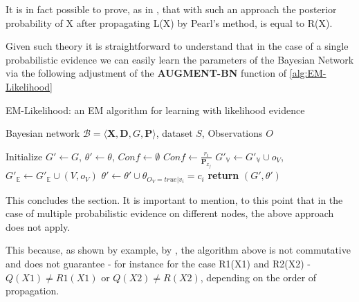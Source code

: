 \documentclass[11pt]{article}
\begin{document}
\begin{article}
It is in fact possible to prove, as in \cite{PENG_2010}, that with
such an approach the posterior probability of X after propagating
L(X) by Pearl’s method, is equal to R(X).

Given such theory it is straightforward to understand that
in the case of a single probabilistic evidence we can easily learn
the parameters of the Bayesian Network via the following adjustment
of the \textbf{AUGMENT-BN} function of \ref{alg:EM-Likelihood}

\algrenewcommand\algorithmicindent{1.5em}%

\begin{algorithm*}[h!]
\caption{EM-Likelihood: an EM algorithm for learning with likelihood evidence}
\label{alg:EM-Likelihood}
\vspace{-10pt}
\begin{multicols}{2}
\begin{algorithmic}[1] 
\Require Bayesian network $\mathcal{B}=\langle \mathbf{X},\mathbf{D}, G, \mathbf{P} \rangle$, dataset $S$, Observations $O$

  \State Initialize $G'\leftarrow G$, $\theta'\leftarrow\theta$, $Conf \leftarrow \emptyset$
    
    $Conf \leftarrow \frac{r_i}{\mathbf{P}_{x_j}}$ 
  \EndFor
    \State $G'_{\mathbb{V}}\leftarrow G'_{\mathbb{V}}\cup o_{V}$, $G'_{\mathbb{E}}\leftarrow G'_{\mathbb{E}}\cup(V,o_{V})$      
       
      \State $\theta'\leftarrow\theta'\cup\theta_{O_{V}=true|v_{i}}=c_{i}$ 
    \EndFor
  \EndFor
\State \textbf{return} $(G',\theta')$
\end{algorithmic}
\end{multicols}
\end{algorithm*}

This concludes the section. It is important to mention, to this
point that in the case of multiple probabilistic evidence on
different nodes, the above approach does not apply.

This because, as shown by example, by \cite{PENG_2010}, the algorithm
above is not commutative and does not guarantee - for instance for
the case R1(X1) and R2(X2) - \(Q(X1) \neq R1(X1)\) or \(Q(X2) \neq
   R(X2)\), depending on the order of propagation.


\end{article}
\end{document}
